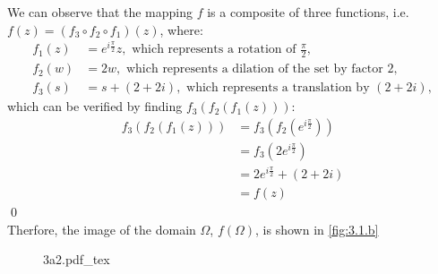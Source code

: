 \documentclass[a4paper, titlepage, DIV=14]{scrartcl}
\newcommand{\incfig}[1]{%
    \def\svgwidth{0.8\columnwidth}
    {#1.pdf_tex}
}
\begin{document}
\begin{enumerate}
\begin{enumerate}[i)]
            We can observe that the mapping $f$ is a composite of three functions, i.e.
            $f(z) = (f_{3} \circ f_{2} \circ f_{1})(z)$, where:
            \begin{align*}
                f_{1}(z) &= e^{i\frac{\pi}{2}} z, \text{ which represents a rotation of } \frac{\pi}{2}, \\
                f_{2}(w) &= 2w, \text{ which represents a dilation of the set by factor 2,} \\
                f_{3}(s) &= s + (2+2i), \text{ which represents a translation by }(2+2i),
            \end{align*}which can be verified by finding $f_{3}(f_{2}(f_{1}(z)))$:
            \begin{align*}
                f_{3}(f_{2}(f_{1}(z))) &= f_{3}(f_{2}(e^{i\frac{\pi}{2}})) \\
                        &= f_{3}(2e^{i\frac{\pi}{2}}) \\
                        &= 2e^{i\frac{\pi}{2}} + (2+2i) \\
                        &= f(z) 
            \end{align*} \qed \\
            Therfore, the image of the domain $\Omega$, $f(\Omega)$, is shown in \autoref{fig:3.1.b} \\
            \begin{figure}[!h]
                \centering
                \incfig{3a2}
                \caption{}
                \label{fig:3.1.b}
            \end{figure} 


\end{enumerate}
\end{enumerate}
\end{document}

